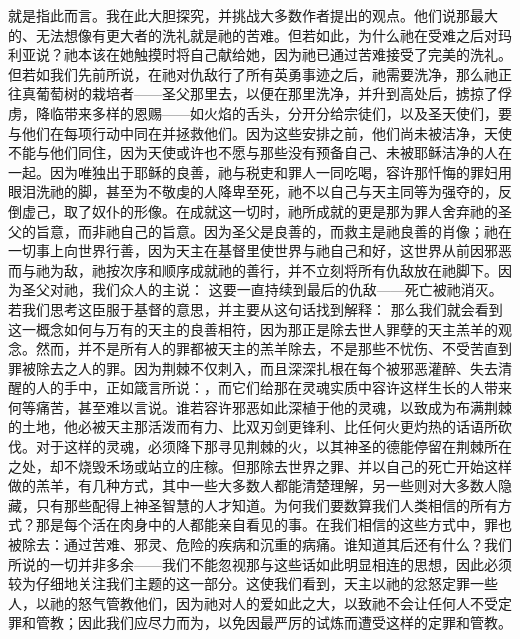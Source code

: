 就是指此而言。我在此大胆探究，并挑战大多数作者提出的观点。他们说那最大的、无法想像有更大者的洗礼就是祂的苦难。但若如此，为什么祂在受难之后对玛利亚说？祂本该在她触摸时将自己献给她，因为祂已通过苦难接受了完美的洗礼。但若如我们先前所说，在祂对仇敌行了所有英勇事迹之后，祂需要洗净，那么祂正往真葡萄树的栽培者——圣父那里去，以便在那里洗净，并升到高处后，掳掠了俘虏，降临带来多样的恩赐——如火焰的舌头，分开分给宗徒们，以及圣天使们，要与他们在每项行动中同在并拯救他们。因为这些安排之前，他们尚未被洁净，天使不能与他们同住，因为天使或许也不愿与那些没有预备自己、未被耶稣洁净的人在一起。因为唯独出于耶稣的良善，祂与税吏和罪人一同吃喝，容许那忏悔的罪妇用眼泪洗祂的脚，甚至为不敬虔的人降卑至死，祂不以自己与天主同等为强夺的，反倒虚己，取了奴仆的形像。在成就这一切时，祂所成就的更是那为罪人舍弃祂的圣父的旨意，而非祂自己的旨意。因为圣父是良善的，而救主是祂良善的肖像；祂在一切事上向世界行善，因为天主在基督里使世界与祂自己和好，这世界从前因邪恶而与祂为敌，祂按次序和顺序成就祂的善行，并不立刻将所有仇敌放在祂脚下。因为圣父对祂，我们众人的主说： 这要一直持续到最后的仇敌——死亡被祂消灭。若我们思考这臣服于基督的意思，并主要从这句话找到解释：  那么我们就会看到这一概念如何与万有的天主的良善相符，因为那正是除去世人罪孽的天主羔羊的观念。然而，并不是所有人的罪都被天主的羔羊除去，不是那些不忧伤、不受苦直到罪被除去之人的罪。因为荆棘不仅刺入，而且深深扎根在每个被邪恶灌醉、失去清醒的人的手中，正如箴言所说：，而它们给那在灵魂实质中容许这样生长的人带来何等痛苦，甚至难以言说。谁若容许邪恶如此深植于他的灵魂，以致成为布满荆棘的土地，他必被天主那活泼而有力、比双刃剑更锋利、比任何火更灼热的话语所砍伐。对于这样的灵魂，必须降下那寻见荆棘的火，以其神圣的德能停留在荆棘所在之处，却不烧毁禾场或站立的庄稼。但那除去世界之罪、并以自己的死亡开始这样做的羔羊，有几种方式，其中一些大多数人都能清楚理解，另一些则对大多数人隐藏，只有那些配得上神圣智慧的人才知道。为何我们要数算我们人类相信的所有方式？那是每个活在肉身中的人都能亲自看见的事。在我们相信的这些方式中，罪也被除去：通过苦难、邪灵、危险的疾病和沉重的病痛。谁知道其后还有什么？我们所说的一切并非多余——我们不能忽视那与这些话如此明显相连的思想，因此必须较为仔细地关注我们主题的这一部分。这使我们看到，天主以祂的忿怒定罪一些人，以祂的怒气管教他们，因为祂对人的爱如此之大，以致祂不会让任何人不受定罪和管教；因此我们应尽力而为，以免因最严厉的试炼而遭受这样的定罪和管教。\par

